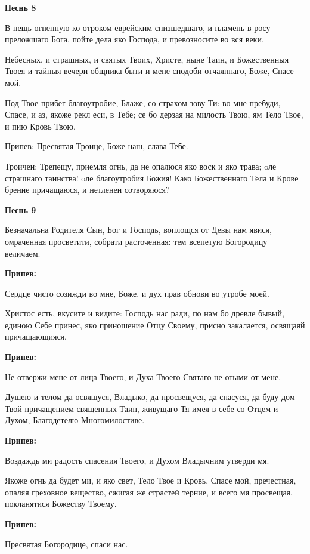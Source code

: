 \medskip
\bfseries Песнь 8\normalfont{}


В пещь огненную ко отроком еврейским снизшедшаго, и пламень в росу преложшаго Бога, пойте дела яко Господа, и превозносите во вся веки.


Небесных, и страшных, и святых Твоих, Христе, ныне Таин, и Божественныя Твоея и тайныя вечери общника быти и мене сподоби отчаяннаго, Боже, Спасе мой.


Под Твое прибег благоутробие, Блаже, со страхом зову Ти: во мне пребуди, Спасе, и аз, якоже рекл еси, в Тебе; се бо дерзая на милость Твою, ям Тело Твое, и пию Кровь Твою.


Припев: Пресвятая Троице, Боже наш, слава Тебе.


Троичен: Трепещу, приемля огнь, да не опалюся яко воск и яко трава; oле страшнаго таинства! oле благоутробия Божия! Како Божественнаго Тела и Крове брение причащаюся, и нетленен сотворяюся?

\medskip
\bfseries Песнь 9\normalfont{}


Безначальна Родителя Сын, Бог и Господь, воплощся от Девы нам явися, омраченная просветити, собрати расточенная: тем всепетую Богородицу величаем.

\medskip
\bfseries Припев:\normalfont{} 


Сердце чисто созижди во мне, Боже, и дух прав обнови во утробе моей.


Христос есть, вкусите и видите: Господь нас ради, по нам бо древле бывый, единою Себе принес, яко приношение Отцу Своему, присно закалается, освящаяй причащающияся.


\medskip
\bfseries Припев:\normalfont{} 


Не отвержи мене от лица Твоего, и Духа Твоего Святаго не отыми от мене.


Душею и телом да освящуся, Владыко, да просвещуся, да спасуся, да буду дом Твой причащением священных Таин, живущаго Тя имея в себе со Отцем и Духом, Благодетелю Многомилостиве.


\medskip
\bfseries Припев:\normalfont{} 


Воздаждь ми радость спасения Твоего, и Духом Владычним утверди мя.


Якоже огнь да будет ми, и яко свет, Тело Твое и Кровь, Спасе мой, пречестная, опаляя греховное вещество, сжигая же страстей терние, и всего мя просвещая, покланятися Божеству Твоему.


\medskip
\bfseries Припев:\normalfont{} 


Пресвятая Богородице, спаси нас.


